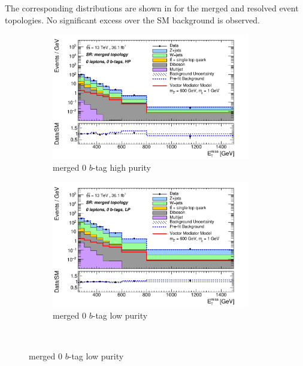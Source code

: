 The corresponding \met distributions are shown in  for the merged and resolved event topologies. No significant excess over the SM background is observed.

\begin{figure}[htbp]
\centering
  \begin{subfigure}{0.49\textwidth}
    \centering
    \includegraphics[width=0.95\textwidth]{figures/monoV/postfit/monoV_0lep_0tag_merged_substrPass_massPass_met_XS.pdf}
    \caption{merged 0 \(b\)-tag high purity}
  \end{subfigure}
  \begin{subfigure}{0.49\textwidth}
    \centering
    \includegraphics[width=0.95\textwidth]{figures/monoV/postfit/monoV_0lep_0tag_merged_substrFail_massPass_met_XS.pdf}
    \caption{merged 0 \(b\)-tag low purity}
  \end{subfigure} \\


\end{figure}
